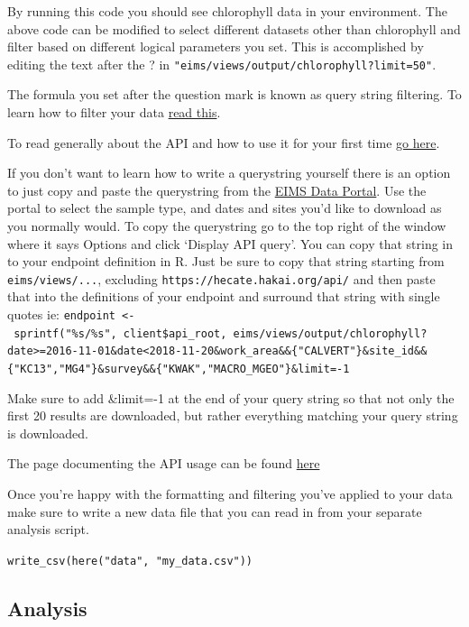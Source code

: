 \documentclass[]{book}
\begin{document}
By running this code you should see chlorophyll data in your
environment. The above code can be modified to select different datasets
other than chlorophyll and filter based on different logical parameters
you set. This is accomplished by editing the text after the ? in
\texttt{"eims/views/output/chlorophyll?limit=50"}.

The formula you set after the question mark is known as query string
filtering. To learn how to filter your data
\href{https://github.com/HakaiInstitute/hakai-api/blob/master/docs/querying-data.md}{read
this}.

To read generally about the API and how to use it for your first time
\href{https://github.com/HakaiInstitute/hakai-api/blob/master/docs/simplified-api-documentation.md\#what-is-the-hakai-api}{go
here}.

If you don't want to learn how to write a querystring yourself there is
an option to just copy and paste the querystring from the
\href{https://hecate.hakai.org/portal2/}{EIMS Data Portal}. Use the
portal to select the sample type, and dates and sites you'd like to
download as you normally would. To copy the querystring go to the top
right of the window where it says Options and click `Display API query'.
You can copy that string in to your endpoint definition in R. Just be
sure to copy that string starting from \texttt{eims/views/...},
excluding \texttt{https://hecate.hakai.org/api/} and then paste that
into the definitions of your endpoint and surround that string with
single quotes ie:
\texttt{endpoint\ \textless{}-\ sprintf("\%s/\%s",\ client\$api\_root,\ \textquotesingle{}eims/views/output/chlorophyll?date\textgreater{}=2016-11-01\&date\textless{}2018-11-20\&work\_area\&\&\{"CALVERT"\}\&site\_id\&\&\{"KC13","MG4"\}\&survey\&\&\{"KWAK","MACRO\_MGEO"\}\&limit=-1\textquotesingle{}}

Make sure to add \&limit=-1 at the end of your query string so that not
only the first 20 results are downloaded, but rather everything matching
your query string is downloaded.

The page documenting the API usage can be found
\href{https://hakaiinstitute.github.io/hakai-api/}{here}

Once you're happy with the formatting and filtering you've applied to
your data make sure to write a new data file that you can read in from
your separate analysis script.

\texttt{write\_csv(here("data",\ "my\_data.csv"))}

\subsection{Analysis}\label{analysis}
\end{document}

